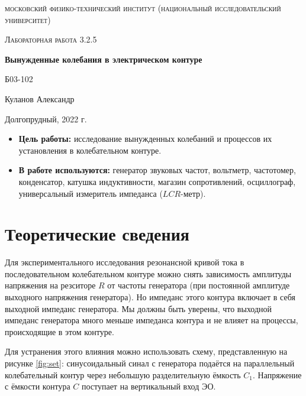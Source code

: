 \documentclass[a4paper, 12pt]{article}
\begin{document}
\begin{titlepage}
	\centering
	\vspace{5cm}
	{\scshape\LARGE московский физико-технический институт (национальный исследовательский университет) \par}
	\vspace{6cm}
	{\scshape\Large Лабораторная работа 3.2.5 \par}
	{\huge\bfseries Вынужденные колебания в электрическом контуре \par}
	\vspace{1cm}
	\vfill
\begin{flushright}
	{\large Б03-102}\par
	\vspace{0.3cm}
	{\LARGE Куланов Александр}
\end{flushright}
	

	\vfill


	Долгопрудный, 2022 г.
\end{titlepage}

\begin{itemize}
	\item \textbf{Цель работы:} исследование вынужденных колебаний и процессов их установления в колебательном контуре.
    \item \textbf{В работе используются:} генератор звуковых частот, вольтметр, частотомер, конденсатор, катушка индуктивности, магазин сопротивлений, осциллограф, универсальный измеритель импеданса ($LCR$-метр).
    
\end{itemize}



\section{Теоретические сведения}

Для экспериментального исследования резонансной кривой тока в последовательном колебательном контуре 
можно снять зависимость амплитуды напряжения на резситоре $R$ от частоты генератора 
(при постоянной амплитуде выходного напряжения генератора). Но импеданс этого контура включает 
в себя выходной импеданс генератора. Мы должны быть уверены, что выходной импеданс генератора 
много меньше импеданса контура и не влияет на процессы, происходящие в этом контуре.
	
	Для устранения этого влияния можно использовать схему, представленную на рисунке 
	\ref{fig:set}: синусоидальный синал с генератора подаётся на параллельный колебательный 
	контур через небольшую разделительную ёмкость $C_1$. Напряжение с ёмкости контура $C$ 
	поступает на вертикальный вход ЭО.
	
\end{document}
